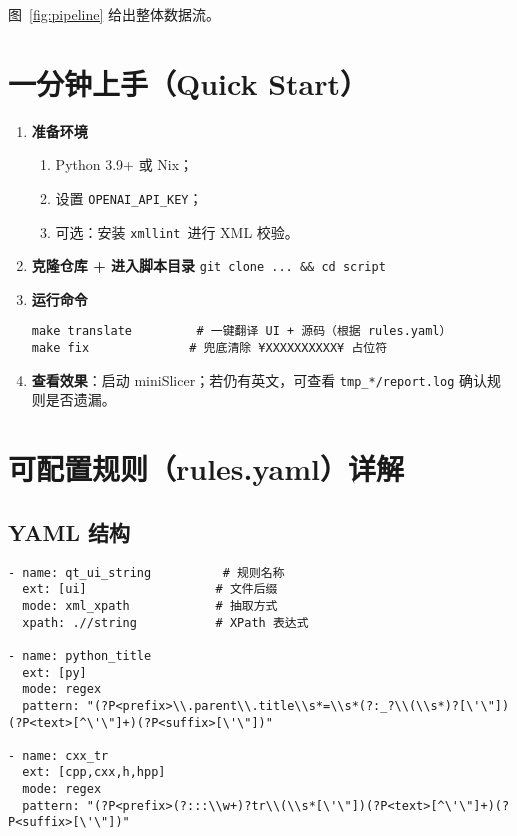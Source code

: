 \documentclass[12pt]{article}
\begin{document}
图~\ref{fig:pipeline} 给出整体数据流。

\begin{center}
\end{center}
\label{fig:pipeline}

\section{一分钟上手（Quick Start）}
\begin{enumerate}
  \item \textbf{准备环境}
    \begin{enumerate}
      \item Python 3.9+ 或 Nix；
      \item 设置 \lstinline|OPENAI_API_KEY|；
      \item 可选：安装 \lstinline|xmllint|\ 进行 XML 校验。
    \end{enumerate}
  \item \textbf{克隆仓库 + 进入脚本目录}
    \lstinline|git clone ... && cd script|
  \item \textbf{运行命令}
  \begin{lstlisting}
make translate         # 一键翻译 UI + 源码（根据 rules.yaml）
make fix              # 兜底清除 ¥XXXXXXXXXX¥ 占位符
  \end{lstlisting}
  \item \textbf{查看效果}：启动 miniSlicer；若仍有英文，可查看 \texttt{tmp\_*/report.log} 确认规则是否遗漏。
\end{enumerate}

\section{可配置规则（rules.yaml）详解}
\subsection{YAML 结构}
\begin{lstlisting}
- name: qt_ui_string          # 规则名称
  ext: [ui]                  # 文件后缀
  mode: xml_xpath            # 抽取方式
  xpath: .//string           # XPath 表达式

- name: python_title
  ext: [py]
  mode: regex
  pattern: "(?P<prefix>\\.parent\\.title\\s*=\\s*(?:_?\\(\\s*)?[\'\"])(?P<text>[^\'\"]+)(?P<suffix>[\'\"])"

- name: cxx_tr
  ext: [cpp,cxx,h,hpp]
  mode: regex
  pattern: "(?P<prefix>(?:::\\w+)?tr\\(\\s*[\'\"])(?P<text>[^\'\"]+)(?P<suffix>[\'\"])"
\end{lstlisting}
\end{document}
